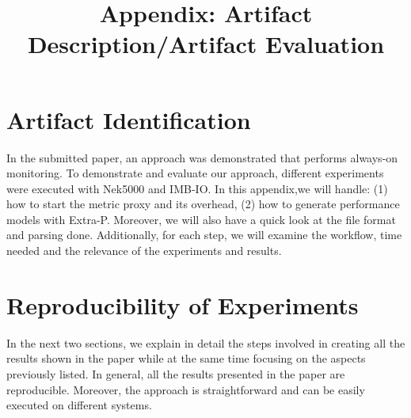 \documentclass[sigconf,nonacm=true]{acmart}
\title[On Enabling Continuous Optimization for HPC Workloads]{Appendix: Artifact Description/Artifact Evaluation}
\begin{document}
\acmPrice{}
\acmDOI{}
\acmISBN{}

\sloppy
\maketitle


\renewcommand{\shortauthors}{ JB. Besnard and A. Tarraf }

\section*{Artifact Identification}
In the submitted paper, an approach was demonstrated that performs always-on monitoring. To demonstrate and evaluate our approach, 
different experiments were executed with Nek5000 and IMB-IO. In this appendix,we will 
handle: 
(1) how to start the metric proxy and its overhead, 
(2) how to generate performance models with Extra-P. 
Moreover, we will also have a quick look at the file format and parsing done. 
Additionally, for each step, we will examine the workflow, time needed and the relevance 
of the experiments and results.

\section*{Reproducibility of Experiments}
In the next two sections, we explain in detail the steps involved in creating all the results shown in the paper while 
at the same time focusing on the aspects previously listed. In general, all 
the results presented in the paper are reproducible. Moreover, 
the approach is straightforward and can be easily executed 
on different systems. 




\end{document}
